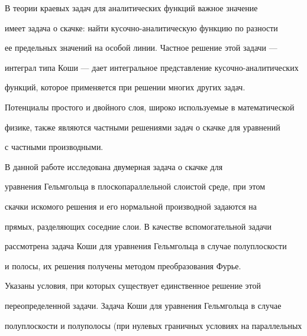 \date{}




\pagestyle{plain} %







\maketitle


\label{begin}








В теории краевых задач для аналитических функций важное значение


имеет задача о скачке: найти кусочно-аналитическую функцию по разности


ее предельных значений на особой линии. Частное решение этой задачи ---


интеграл типа Коши --- дает интегральное представление кусочно-аналитических


функций, которое применяется при решении многих других задач.


Потенциалы простого и двойного слоя, широко используемые в математической


физике, также являются частными решениями задач о скачке для уравнений


с частными производными.





В данной работе исследована двумерная задача о скачке для


уравнения Гельмгольца в плоскопараллельной слоистой среде, при этом


скачки искомого решения и его нормальной производной задаются на


прямых, разделяющих соседние слои. В качестве вспомогательной задачи


рассмотрена задача Коши для уравнения Гельмгольца в случае полуплоскости


и полосы, их решения получены методом преобразования Фурье.


Указаны условия, при которых существует единственное решение этой


переопределенной задачи. Задача Коши для уравнения Гельмгольца в случае


полуплоскости и полуполосы (при нулевых граничных условиях на параллельных


